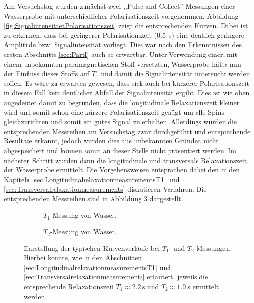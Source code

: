Am Versuchstag wurden zunächst zwei ,,Pulse and Collect''-Messungen einer Wasserprobe mit unterschiedlicher Polarisationszeit vorgenommen.
Abbildung \ref{fig:SignalintensitaetPolarisationszeit} zeigt die entsprechenden Kurven.
Dabei ist zu erkennen, dass bei geringerer Polarisationszeit (\SI{0.5}{\second}) eine deutlich geringere Amplitude bzw. Signalintensität vorliegt.
Dies war nach den Erkenntnissen des ersten Abschnitts \ref{sec:PartI} auch so erwartbar.
Unter Verwendung einer, mit einem unbekannten paramagnetischen Stoff versetzten, Wasserprobe hätte nun der Einfluss dieses Stoffs auf $T_1$ und damit die Signalintensität untersucht werden sollen.
Es wäre zu erwarten gewesen, dass sich auch bei kürzerer Polarisationszeit in diesem Fall kein deutlicher Abfall der Signalintensität ergibt.
Dies ist wie oben angedeutet damit zu begründen, dass die longitudinale Relaxationszeit kleiner wird und somit schon eine kürzere Polarisationszeit genügt um alle Spins gleichzurichten und somit ein gutes Signal zu erhalten.
Allerdings wurden die entsprechenden Messreihen am Versuchstag zwar durchgeführt und entsprechende Resultate erkannt, jedoch wurden dies aus unbekannten Gründen nicht abgespeichert und können somit an dieser Stelle nicht präsentiert werden.\newline
\newline
Im nächsten Schritt wurden dann die longitudinale und transversale Relaxationszeit der Wasserprobe ermittelt.
Die Vorgehensweisen entsprachen dabei den in den Kapiteln \ref{sec:LongitudinalrelaxationmeasurementsT1} und \ref{sec:Transversalrelaxationmeasurements} diskutieren Verfahren.
Die entsprechenden Messreihen sind in Abbildung \ref{fig:T1T2Wasser} dargestellt.

\begin{figure}[H]
    \begin{subfigure}[b]{0.5\textwidth}
        \centering
        \resizebox{1\textwidth}{!}{}
        \caption{$T_1$-Messung von Wasser.}
        \label{fig:T1Wasser}
    \end{subfigure}
    \begin{subfigure}[b]{0.5\textwidth}
        \centering
        \resizebox{1\textwidth}{!}{}
        \caption{$T_2$-Messung von Wasser.}
        \label{fig:T2Wasser}
    \end{subfigure}
    \caption[$T_1$- und $T_2$-Messung von Wasser.]{Darstellung der typischen Kurvenverläufe bei $T_1$- und $T_2$-Messungen.
    Hierbei konnte, wie in den Abschnitten \ref{sec:LongitudinalrelaxationmeasurementsT1} und \ref{sec:Transversalrelaxationmeasurements} erläutert, jeweils die entsprechende Relaxationszeit $T_1 \approx \SI{2.2}{\second}$ und $T_2 \approx \SI{1.9}{\second}$ ermittelt werden.}
    \label{fig:T1T2Wasser}
\end{figure}

